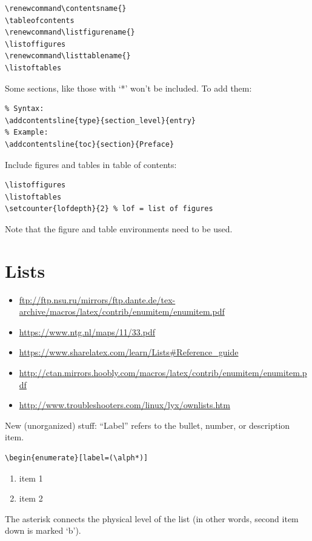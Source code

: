 \documentclass{article}
\begin{document}
\begin{lstlisting}
\renewcommand\contentsname{}
\tableofcontents
\renewcommand\listfigurename{}
\listoffigures
\renewcommand\listtablename{}
\listoftables
\end{lstlisting}


Some sections, like those with `*' won't be included. To add them:
\begin{lstlisting}
% Syntax:
\addcontentsline{type}{section_level}{entry}
% Example:
\addcontentsline{toc}{section}{Preface}
\end{lstlisting}


Include figures and tables in table of contents:
\begin{lstlisting}
\listoffigures
\listoftables
\setcounter{lofdepth}{2} % lof = list of figures
\end{lstlisting}
Note that the figure and table environments need to be used.



\newpage
\section{Lists}
\begin{itemize}
    \item \url{ftp://ftp.nsu.ru/mirrors/ftp.dante.de/tex-archive/macros/latex/contrib/enumitem/enumitem.pdf}
    \item \url{https://www.ntg.nl/maps/11/33.pdf}
    \item \url{https://www.sharelatex.com/learn/Lists#Reference_guide}
    \item \url{http://ctan.mirrors.hoobly.com/macros/latex/contrib/enumitem/enumitem.pdf}
    \item \url{http://www.troubleshooters.com/linux/lyx/ownlists.htm}
\end{itemize}

New (unorganized) stuff:
``Label'' refers to the bullet, number, or description item.
\begin{lstlisting}
\begin{enumerate}[label=(\alph*)]
\end{lstlisting}

\begin{enumerate}[label=(\alph*)]
    \item item 1
    \item item 2
\end{enumerate}
The asterisk connects the physical level of the list
(in other words, second item down is marked `b').
\end{document}
